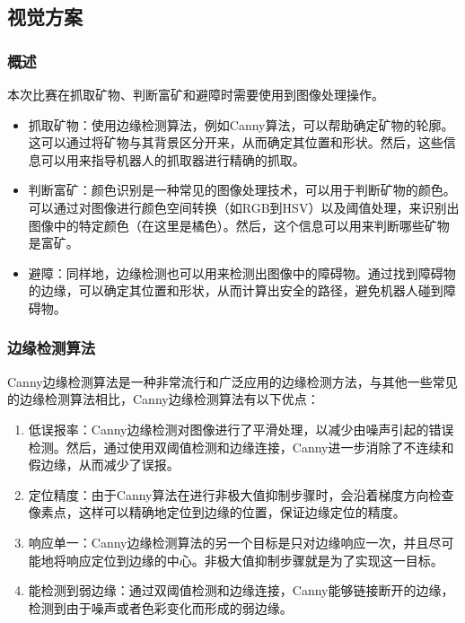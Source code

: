 \documentclass[10pt]{ctexart}
\begin{document}




\subsection{视觉方案}
\subsubsection{概述}
本次比赛在抓取矿物、判断富矿和避障时需要使用到图像处理操作。
\begin{itemize}
    \item 抓取矿物：使用边缘检测算法，例如Canny算法，可以帮助确定矿物的轮廓。这可以通过将矿物与其背景区分开来，从而确定其位置和形状。然后，这些信息可以用来指导机器人的抓取器进行精确的抓取。
    \item 判断富矿：颜色识别是一种常见的图像处理技术，可以用于判断矿物的颜色。可以通过对图像进行颜色空间转换（如RGB到HSV）以及阈值处理，来识别出图像中的特定颜色（在这里是橘色）。然后，这个信息可以用来判断哪些矿物是富矿。
    \item 避障：同样地，边缘检测也可以用来检测出图像中的障碍物。通过找到障碍物的边缘，可以确定其位置和形状，从而计算出安全的路径，避免机器人碰到障碍物。
\end{itemize}

\subsubsection{边缘检测算法}

Canny边缘检测算法是一种非常流行和广泛应用的边缘检测方法，与其他一些常见的边缘检测算法相比，Canny边缘检测算法有以下优点：

\begin{enumerate}
    \item 低误报率：Canny边缘检测对图像进行了平滑处理，以减少由噪声引起的错误检测。然后，通过使用双阈值检测和边缘连接，Canny进一步消除了不连续和假边缘，从而减少了误报。
    \item 定位精度：由于Canny算法在进行非极大值抑制步骤时，会沿着梯度方向检查像素点，这样可以精确地定位到边缘的位置，保证边缘定位的精度。
    \item 响应单一：Canny边缘检测算法的另一个目标是只对边缘响应一次，并且尽可能地将响应定位到边缘的中心。非极大值抑制步骤就是为了实现这一目标。
    \item 能检测到弱边缘：通过双阈值检测和边缘连接，Canny能够链接断开的边缘，检测到由于噪声或者色彩变化而形成的弱边缘。
\end{enumerate}
\end{document}
